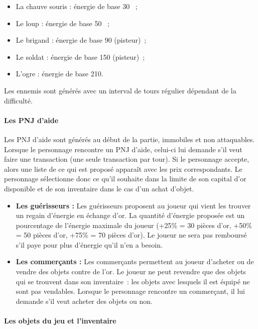 \documentclass[11pt]{article}
\begin{document}
\begin{itemize}
    \item La chauve souris : énergie de base 30 ~;
    \item Le loup : énergie de base 50 ~;
    \item Le brigand : énergie de base 90 (pisteur)~;
    \item Le soldat : énergie de base 150 (pisteur)~;
    \item L'ogre : énergie de base 210.
\end{itemize}

Les ennemis sont générés avec un interval de tours régulier dépendant de la difficulté.

\paragraph{Les PNJ d'aide}

Les PNJ d'aide sont générés au début de la partie, immobiles et non attaquables. Lorsque le personnage rencontre un PNJ d'aide, celui-ci lui demande s’il veut faire une transaction (une seule transaction par tour). Si le personnage accepte, alors une liste de ce qui est proposé apparaît avec les prix correspondants. Le personnage sélectionne donc ce qu’il souhaite dans la limite de son capital d’or disponible et de son inventaire dans le cas d'un achat d'objet.

\begin{itemize}
   \item \textbf{Les guérisseurs : }Les guérisseurs proposent au joueur qui vient les trouver un regain d'énergie en échange d'or. La quantité d'énergie proposée est un pourcentage de l'énergie maximale du joueur (+25\% = 30 pièces d'or, +50\% = 50 pièces d'or, +75\% = 70 pièces d'or). Le joueur ne sera pas remboursé s'il paye pour plus d'énergie qu'il n'en a besoin.
   \item \textbf{Les commerçants : }Les commerçants permettent au joueur d'acheter ou de vendre des objets contre de l'or. Le joueur ne peut revendre que des objets qui se trouvent dans son inventaire~: les objets avec lesquels il est équipé ne sont pas vendables. Lorsque le personnage rencontre un commerçant, il lui demande s’il veut acheter des objets ou non. 
\end{itemize}

\paragraph{Les objets du jeu et l'inventaire}
\end{document}
